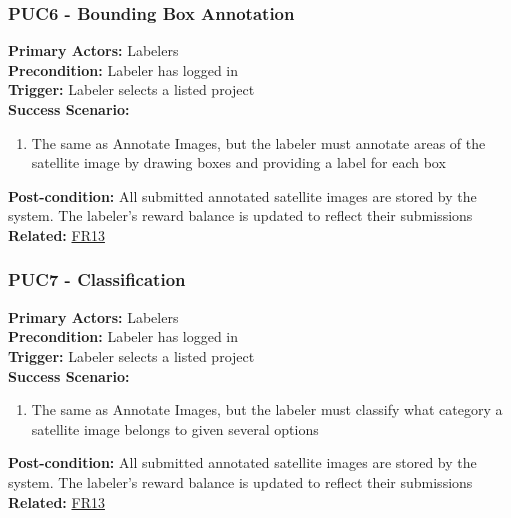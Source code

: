 \documentclass[12pt]{article}
\begin{document}
\subsubsection*{PUC6 - Bounding Box Annotation}
\label{sec:PUC6}
\textbf{Primary Actors:} Labelers\\ 
\textbf{Precondition:} Labeler has logged in\\
\textbf{Trigger:} Labeler selects a listed project\\
\textbf{Success Scenario:}
\begin{enumerate}
    \item The same as Annotate Images, but the labeler must annotate areas of the satellite image by drawing boxes and providing a label for each box
\end{enumerate}
\textbf{Post-condition:} All submitted annotated satellite images are stored by the system. The labeler's reward balance is updated to reflect their submissions\\
\textbf{Related:} \hyperref[sec:FR13]{FR13}

\subsubsection*{PUC7 - Classification}
\label{sec:PUC7}
\textbf{Primary Actors:} Labelers\\ 
\textbf{Precondition:} Labeler has logged in\\
\textbf{Trigger:} Labeler selects a listed project\\
\textbf{Success Scenario:}
\begin{enumerate}
    \item The same as Annotate Images, but the labeler must classify what category a satellite image belongs to given several options
\end{enumerate}
\textbf{Post-condition:} All submitted annotated satellite images are stored by the system. The labeler's reward balance is updated to reflect their submissions\\
\textbf{Related:} \hyperref[sec:FR13]{FR13}
\end{document}
